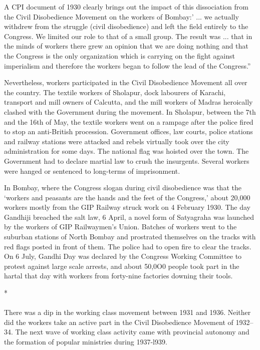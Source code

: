 A CPI document of 1930 clearly brings out the impact of this dissociation from the Civil Disobedience Movement on the workers of Bombay:' ... we actually withdrew from the struggle (civil disobedience) and left the field entirely to the Congress. We limited our role to that of a small group. The result was ... that in the minds of workers there grew an opinion that we are doing nothing and that the Congress is the only organization which is carrying on the fight against imperialism and therefore the workers began to follow the lead of the Congress.''

Nevertheless, workers participated in the Civil Disobedience Movement all over the country. The textile workers of Sholapur, dock labourers of Karachi, transport and mill owners of Calcutta, and the mill workers of Madras heroically clashed with the Government during the movement. In Sholapur, between the 7th and the 16th of May, the textile workers went on a rampage after the police fired to stop an anti-British procession. Government offices, law courts, police stations and railway stations were attacked and rebels virtually took over the city administration for some days. The national flag was hoisted over the town. The Government had to declare martial law to crush the insurgents. Several workers were hanged or sentenced to long-terms of imprisonment.

In Bombay, where the Congress slogan during civil disobedience was that the `workers and peasants are the hands and the feet of the Congress,' about 20,000 workers mostly from the GIP Railway struck work on 4 February 1930. The day Gandhiji breached the salt law, 6 April, a novel form of Satyagraha was launched by the workers of GIP Railwaymen's Union. Batches of workers went to the suburban stations of North Bombay and prostrated themselves on the tracks with red flags posted in front of them. The police had to open fire to clear the tracks. On 6 July, Gandhi Day was declared by the Congress Working Committee to protest against large scale arrests, and about 50,0O0 people took part in the hartal that day with workers from forty-nine factories downing their tools.

\begin{center}*\end{center}

\paragraph*{}

There was a dip in the working class movement between 1931 and 1936. Neither did the workers take an active part in the Civil Disobedience Movement of 1932--34. The next wave of working class activity came with provincial autonomy and the formation of popular ministries during 1937-l939.

